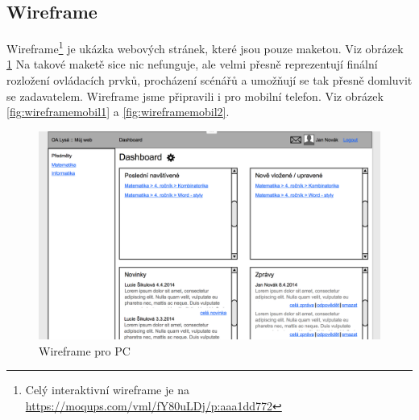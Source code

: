 \documentclass[thesis=B,czech]{FITthesis}[2012/06/26]
\begin{document}
\subsection{Wireframe}

Wireframe\footnote{Celý interaktivní wireframe je na \url{ https://moqups.com/vml/fY80uLDj/p:aaa1dd772}} je ukázka webových stránek, které jsou pouze maketou. Viz obrázek \ref{fig:wireframepc} Na takové maketě sice nic nefunguje, ale velmi přesně reprezentují finální rozložení ovládacích prvků, procházení scénářů a umožňují se tak přesně domluvit se zadavatelem. Wireframe jsme připravili i pro mobilní telefon. Viz obrázek \ref{fig:wireframemobil1} a \ref{fig:wireframemobil2}.

\begin{figure}
  \centering
	\includegraphics[scale=0.35]{wireframe_desktop_dashboard.png}
	\caption{Wireframe pro PC} \label{fig:wireframepc} 
\end{figure}
\end{document}
